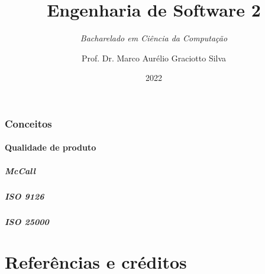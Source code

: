\documentclass[utf8, english, brazil, usepdftitle=false, svgnames, color={table, fixpdftex, hyperref, fixinclude, xcdraw}, t]{beamer}
\title[]{\large Engenharia de Software 2}
\subtitle{\textit{Bacharelado em Ciência da Computação}}
\author[UTFPR]{Prof. Dr. Marco Aurélio Graciotto Silva}
\date[]{2022}
\begin{document}
\frontmatter{}


\mainmatter{}

% 
% 

\section{Conceitos}

% 

\subsection{Qualidade de produto}


\subsubsection{McCall}


\subsubsection{ISO 9126}


% 

\subsubsection{ISO 25000}



% 



\backmatter{}
\part{Referências e créditos}

\end{document}
